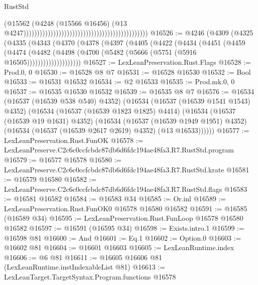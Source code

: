 \begin{lexlean}{RustStd}
\begin{coremodule}
                                                                                          (@15562
                                                                                            (@4248
                                                                                              (@15566
                                                                                                @16456)
                                                                                              (@13
                                                                                                @4247))))))))))))))))))))))))))))))))))))))))))))))
@16526 := @4246
    (@4309
      (@4325
        (@4335
          (@4343
            (@4370
              (@4378
                (@4397
                  (@4405
                    (@4422
                      (@4434
                        (@4451
                          (@4459
                            (@4474
                              (@4482
                                (@4498 (@4700 (@5482 (@5666 (@5751 (@5916 @16505))))))))))))))))))))
@16527 := LexLeanPreservation.Rust.Flags
@16528 := Prod.{0, 0}
@16530 := @16528 @8 @7
@16531 := @16528 @16530
@16532 := Bool
@16533 := @16531 @16532
@16534 := @2 @16533
@16535 := Prod.mk.{0, 0}
@16537 := @16535 @16530 @16532
@16539 := @16535 @8 @7
@16576 := @16534
    (@16537 (@16539 @538 @540) @4352)
    (@16534
      (@16537 (@16539 @1541 @1543) @4352)
      (@16534
        (@16537 (@16539 @1823 @1825) @4414)
        (@16534
          (@16537 (@16539 @19 @1631) @4352)
          (@16534
            (@16537 (@16539 @1949 @1951) @4352)
            (@16534 (@16537 (@16539 @2617 @2619) @4352) (@13 @16533))))))
@16577 := LexLeanPreservation.Rust.FunOK
@16578 := LexLeanPreserve.C2c6c0ccfcbdc87db6d6fdc194ae48fa3.R7.RustStd.program
@16579 := @16577 @16578
@16580 := LexLeanPreserve.C2c6c0ccfcbdc87db6d6fdc194ae48fa3.R7.RustStd.krate
@16581 := @16579 @16580
@16582 := LexLeanPreserve.C2c6c0ccfcbdc87db6d6fdc194ae48fa3.R7.RustStd.flags
@16583 := @16581 @16582
@16584 := @16583 @34
@16585 := Or.inl
@16589 := LexLeanPreservation.Rust.FunOK0 @16578 @16580 @16582
@16591 := @16585 (@16589 @34)
@16595 := LexLeanPreservation.Rust.FunLoop @16578 @16580 @16582
@16597 := @16591 (@16595 @34)
@16598 := Exists.intro.{1}
@16599 := @16598 @81
@16600 := And
@16601 := Eq.{1}
@16602 := Option.{0}
@16603 := @16602 @81
@16604 := @16601 @16603
@16605 := LexLeanRuntime.index
@16606 := @6 @81
@16611 := @16605 @16606 @81 (LexLeanRuntime.instIndexableList @81)
@16613 := LexLeanTarget.TargetSyntax.Program.functions @16578

\end{coremodule}
\end{lexlean}

